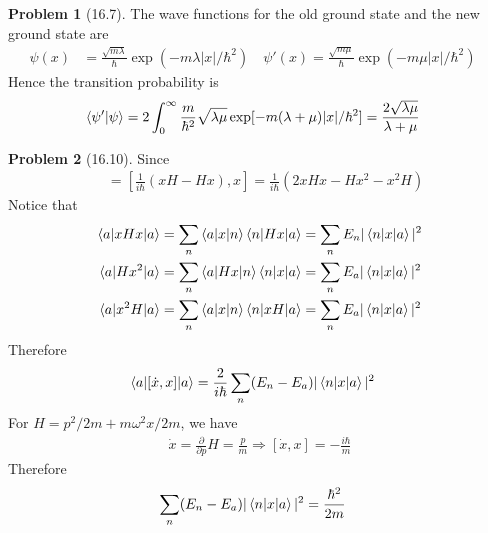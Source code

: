 \documentclass[twoside,11pt]{article}
\theoremstyle{definition}
\newtheorem{problem}{Problem}
\theoremstyle{remark}
\begin{document}
\begin{problem}[16.7]
The wave functions for the old ground state and the new ground state are
\begin{align*}
    \psi(x) &= \frac{\sqrt{m\lambda}}{\hbar}\exp (-m\lambda|x|/\hbar^2)\quad
    \psi'(x) = \frac{\sqrt{m\mu}}{\hbar}\exp (-m\mu|x|/\hbar^2)\quad
\end{align*}
Hence the transition probability is
\begin{align*}
    \braket{\psi'|\psi} &= 2\int_0^\infty \frac{m}{\hbar^2}
    \sqrt{\lambda\mu}\exp[-m(\lambda+\mu)|x|/\hbar^2] = \frac{2\sqrt{\lambda\mu}}{\lambda+\mu}
\end{align*}
\end{problem}



\begin{problem}[16.10]
Since
\begin{align*}
    [\dot{x}, x] &= \left[\frac{1}{i\hbar}(xH-Hx), x\right] = \frac{1}{i\hbar}
    (2xHx - Hx^2 - x^2H)
\end{align*}
Notice that
\begin{align*}
    \braket{a|xHx|a} &= \sum_n\braket{a|x|n}\braket{n|Hx|a}
    = \sum_n E_n|\braket{n|x|a}|^2\\
    \braket{a|Hx^2|a} &= \sum_n \braket{a|Hx|n}\braket{n|x|a} = \sum_n E_a|\braket{n|x|a}|^2\\
    \braket{a|x^2H|a} &= \sum_n \braket{a|x|n}\braket{n|xH|a} = \sum_n E_a|\braket{n|x|a}|^2
\end{align*}
Therefore
\begin{align*}
    \braket{a|[\dot{x}, x]|a} &= \frac{2}{i\hbar}\sum_n (E_n-E_a)|\braket{n|x|a}|^2
\end{align*}
For $H = p^2/2m + m\omega^2 x/2m$, we have
\begin{align*}
    \dot{x} = \frac{\partial }{\partial p}H = \frac{p}{m}
    \Rightarrow [\dot{x}, x] = -\frac{i\hbar}{m}
\end{align*}
Therefore
\begin{align*}
    \sum_n(E_n-E_a)|\braket{n|x|a}|^2 &= \frac{\hbar^2}{2m}
\end{align*}


\end{problem}


\end{document}
